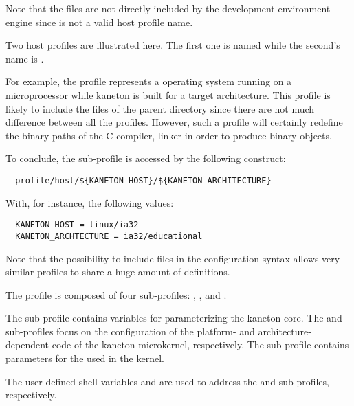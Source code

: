 Note that the files  are not directly included by the
development environment engine since  is not a valid host
profile name.

Two host profiles are illustrated here. The first one is named
 while the second's name is .

For example, the   profile represents a
 operating system running on a 
microprocessor while kaneton is built for a  target
architecture. This profile is likely to include the  files
of the parent directory since there are not much difference between all the
  profiles. However, such a profile will
certainly redefine the binary paths of the C compiler, linker \etc{} in order
to produce  binary objects.

To conclude, the  sub-profile is accessed by the following
construct:

\begin{verbatim}
  profile/host/${KANETON_HOST}/${KANETON_ARCHITECTURE}
\end{verbatim}

With, for instance, the following values:

\begin{verbatim}
  KANETON_HOST = linux/ia32
  KANETON_ARCHTECTURE = ia32/educational
\end{verbatim}

Note that the possibility to include files in the configuration syntax allows
very similar profiles to share a huge amount of definitions.



The  profile is composed of four sub-profiles: ,
,  and .

The  sub-profile contains variables for parameterizing the
kaneton core. The  and  sub-profiles
focus on the configuration of the platform- and architecture-dependent code
of the kaneton microkernel, respectively. The  sub-profile
contains parameters for the  used in the kernel.

The user-defined shell variables  and
 are used to address the 
and  sub-profiles, respectively.

